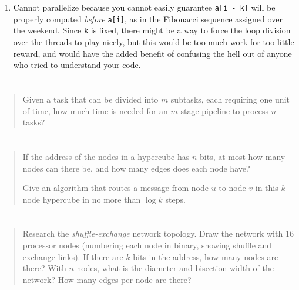 \documentclass{article}
\begin{document}
\begin{enumerate}
        \item Cannot parallelize because you cannot easily guarantee \texttt{a[i - k]} will be properly computed \textit{before} \texttt{a[i]}, as in the Fibonacci sequence assigned over the weekend. Since \texttt{k} is fixed, there might be a way to force the loop division over the threads to play nicely, but this would be too much work for too little reward, and would have the added benefit of confusing the hell out of anyone who tried to understand your code.
    \end{enumerate}

\section{}
    \begin{quote}
        Given a task that can be divided into $m$ subtasks, each requiring one unit of time, how much time is needed for an $m$-stage pipeline to process $n$ tasks?
    \end{quote}

\section{}
    \begin{quote}
        If the address of the nodes in a hypercube has $n$ bits, at most how many nodes can there be, and how many edges does each node have?

        Give an algorithm that routes a message from node $u$ to node $v$ in this $k$-node hypercube in no more than $\log k$ steps.
    \end{quote}

\section{}
    \begin{quote}
        Research the \textit{shuffle-exchange} network topology. Draw the network with 16 processor nodes (numbering each node in binary, showing shuffle and exchange links). If there are $k$ bits in the address, how many nodes are there? With $n$ nodes, what is the diameter and bisection width of the network? How many edges per node are there?
    \end{quote}
\end{document}
